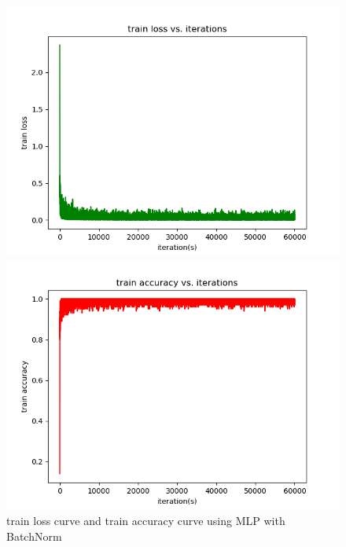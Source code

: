 \documentclass{elegantbook}
\begin{document}
\begin{figure}[!h]
	\centering
	\begin{minipage}[t]{0.48\textwidth}
		\centering
		\includegraphics[width=\textwidth]{../results/trainloss11}
	\end{minipage}
	\begin{minipage}[t]{0.48\textwidth}
		\centering
		\includegraphics[width=\textwidth]{../results/trainacc11}
	\end{minipage}
	\caption{\label{trainres11}train loss curve and train accuracy curve using MLP with BatchNorm}
\end{figure}
\end{document}
